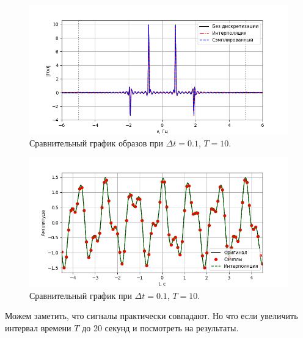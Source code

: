 \documentclass[a4paper]{article}
\begin{document}
\begin{figure}[H]
  \centering
  \includegraphics[width=\textwidth]{src/task_2/1_freq_10_0.1.png}
  \caption{Сравнительный график образов при $\Delta t=0.1$, $T=10$.} 
\end{figure}
\begin{figure}[H]
  \centering
  \includegraphics[width=\textwidth]{src/task_2/1_time_10_0.1.png}
  \caption{Сравнительный график при $\Delta t=0.1$, $T=10$.} 
\end{figure}
\noindent Можем заметить, что сигналы практически совпадают. Но что если увеличить интервал времени \(T\) до 20 секунд и посмотреть на результаты. 
\end{document}
